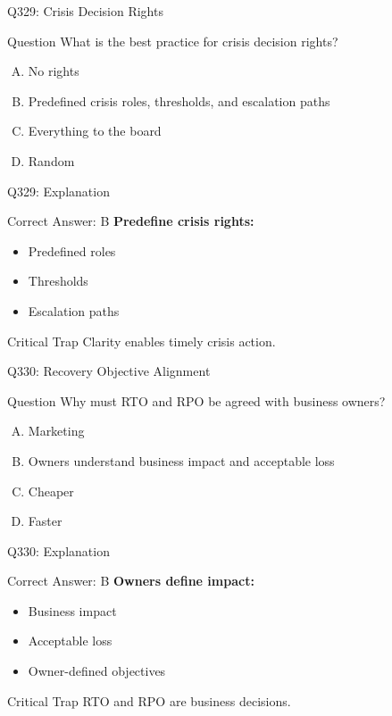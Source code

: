 \documentclass{beamer}
\begin{document}
	\begin{frame}{Q329: Crisis Decision Rights}
		\begin{block}{Question}
			What is the best practice for crisis decision rights?
		\end{block}
		\begin{enumerate}[(A)]
			\item No rights
			\item Predefined crisis roles, thresholds, and escalation paths
			\item Everything to the board
			\item Random
		\end{enumerate}
	\end{frame}
	
	\begin{frame}{Q329: Explanation}
		\begin{block}{Correct Answer: B}
			\textbf{Predefine crisis rights:}
			\begin{itemize}
				\item Predefined roles
				\item Thresholds
				\item Escalation paths
			\end{itemize}
		\end{block}
		\begin{alertblock}{Critical Trap}
			Clarity enables timely crisis action.
		\end{alertblock}
	\end{frame}
	
	\begin{frame}{Q330: Recovery Objective Alignment}
		\begin{block}{Question}
			Why must RTO and RPO be agreed with business owners?
		\end{block}
		\begin{enumerate}[(A)]
			\item Marketing
			\item Owners understand business impact and acceptable loss
			\item Cheaper
			\item Faster
		\end{enumerate}
	\end{frame}
	
	\begin{frame}{Q330: Explanation}
		\begin{block}{Correct Answer: B}
			\textbf{Owners define impact:}
			\begin{itemize}
				\item Business impact
				\item Acceptable loss
				\item Owner-defined objectives
			\end{itemize}
		\end{block}
		\begin{alertblock}{Critical Trap}
			RTO and RPO are business decisions.
		\end{alertblock}
	\end{frame}
	
\end{document}
